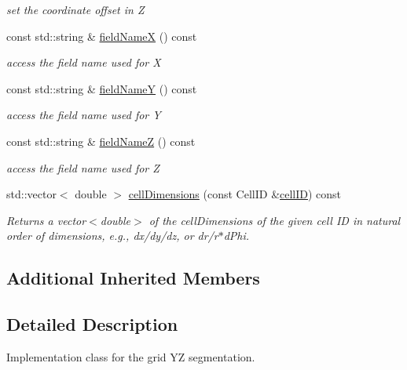 \begin{DoxyCompactItemize}
\begin{DoxyCompactList}\small\item\em set the coordinate offset in Z \end{DoxyCompactList}\item 
const std\+::string \& \hyperlink{class_d_d4hep_1_1_geometry_1_1_cartesian_grid_y_z_a4a2d357e2409768d283e10882742d1d4}{field\+NameX} () const
\begin{DoxyCompactList}\small\item\em access the field name used for X \end{DoxyCompactList}\item 
const std\+::string \& \hyperlink{class_d_d4hep_1_1_geometry_1_1_cartesian_grid_y_z_a2364df2f32fbd8331cbdbf80886ca105}{field\+NameY} () const
\begin{DoxyCompactList}\small\item\em access the field name used for Y \end{DoxyCompactList}\item 
const std\+::string \& \hyperlink{class_d_d4hep_1_1_geometry_1_1_cartesian_grid_y_z_ae79873bbd9d6d0a5725c46e3efe1e60d}{field\+NameZ} () const
\begin{DoxyCompactList}\small\item\em access the field name used for Z \end{DoxyCompactList}\item 
std\+::vector$<$ double $>$ \hyperlink{class_d_d4hep_1_1_geometry_1_1_cartesian_grid_y_z_a04d919be5d065a1e140dd7013e98f461}{cell\+Dimensions} (const Cell\+ID \&\hyperlink{class_d_d4hep_1_1_geometry_1_1_cartesian_grid_y_z_a90bd49763478a3495fc0f00b6284a65d}{cell\+ID}) const
\begin{DoxyCompactList}\small\item\em Returns a vector$<$double$>$ of the cell\+Dimensions of the given cell ID in natural order of dimensions, e.\+g., dx/dy/dz, or dr/r$\ast$d\+Phi. \end{DoxyCompactList}\end{DoxyCompactItemize}
\subsection*{Additional Inherited Members}


\subsection{Detailed Description}
Implementation class for the grid YZ segmentation. 

